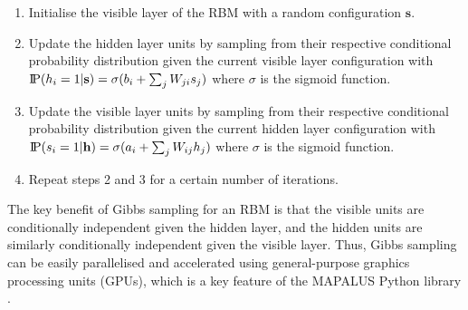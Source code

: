 \begin{enumerate}
    \item Initialise the visible layer of the RBM with a random configuration $\mathbf{s}$.
    \item Update the hidden layer units by sampling from their respective conditional probability distribution given the current visible layer configuration with $\text{I\kern-0.15em P}(h_i=1|\mathbf{s}) = \sigma(b_i + \sum_j W_{ji}s_j)$ where $\sigma$ is the sigmoid function.
    \item Update the visible layer units by sampling from their respective conditional probability distribution given the current hidden layer configuration with $\text{I\kern-0.15em P}(s_i=1|\mathbf{h}) = \sigma(a_i + \sum_j W_{ij}h_j)$ where $\sigma$ is the sigmoid function.
    \item Repeat steps 2 and 3 for a certain number of iterations.
\end{enumerate}

The key benefit of Gibbs sampling for an RBM is that the visible units are conditionally independent given the hidden layer, and the hidden units are similarly conditionally independent given the visible layer. Thus, Gibbs sampling can be easily parallelised and accelerated using general-purpose graphics processing units (GPUs), which is a key feature of the MAPALUS Python library \cite{b25}.